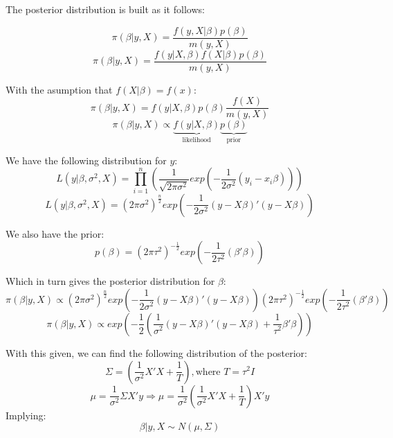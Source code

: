\documentclass[12pt,onecolumn]{article}
\begin{document}
\begin{enumerate}
  The posterior distribution is built as it follows:

  \begin{equation*}
      \pi(\beta|y,X)=\frac{f(y,X|\beta)p(\beta)}{m(y,X)}
  \end{equation*}
  \begin{equation*}
    \pi(\beta|y,X)=\frac{f(y|X,\beta)f(X|\beta)p(\beta)}{m(y,X)}
  \end{equation*}

  With the asumption that $f(X|\beta)=f(x)$:
  \begin{equation*}
      \pi(\beta|y,X)=f(y|X,\beta)p(\beta)\frac{f(X)}{m(y,X)}
  \end{equation*}
  \begin{equation*}
      \pi(\beta|y,X)\propto\underbrace{f(y|X,\beta)}_\text{likelihood}\underbrace{p(\beta)}_\text{prior}
  \end{equation*}

  We have the following distribution for $y$:
  \begin{equation*}
      L(y|\beta,\sigma^2,X)=\prod_{i=1}^{n}\left(\frac{1}{\sqrt{2\pi\sigma^2}}exp\left({-\frac{1}{2\sigma^2}(y_i-x_i\beta)}\right)\right)
  \end{equation*}
  \begin{equation*}
      L(y|\beta,\sigma^2,X)=(2\pi\sigma^2)^{\frac{n}{2}}{exp\left(-\frac{1}{2\sigma^2}(y-X\beta)'(y-X\beta)\right)}
  \end{equation*}

  We also have the prior:
  \begin{equation*}
      p(\beta)=\left(2\pi\tau^2\right)^{-\frac{1}{2}}exp\left(-\frac{1}{2\tau^2}(\beta'\beta)\right)
  \end{equation*}

  Which in turn gives the posterior distribution for $\beta$:
  \begin{equation*}
      \pi(\beta|y,X)\propto(2\pi\sigma^2)^{\frac{n}{2}}{exp\left(-\frac{1}{2\sigma^2}(y-X\beta)'(y-X\beta)\right)}\left(2\pi\tau^2\right)^{-\frac{1}{2}}exp\left(-\frac{1}{2\tau^2}(\beta'\beta)\right)
  \end{equation*}
  \begin{equation*}
      \pi(\beta|y,X)\propto{exp\left(-\frac{1}{2}\left(\frac{1}{\sigma^2}{(y-X\beta)'(y-X\beta)}+\frac{1}{\tau^2}\beta'\beta\right)\right)}
  \end{equation*}
  
  With this given, we can find the following distribution of the posterior:
  \begin{equation*}
      \Sigma=\left(\frac{1}{\sigma^2}X'X+\frac{1}{T}\right), \text{where $T=\tau^2I$}
  \end{equation*}
  \begin{equation*}
      \mu=\frac{1}{\sigma^2}\Sigma{X'y}\Rightarrow\mu=\frac{1}{\sigma^2}\left(\frac{1}{\sigma^2}X'X+\frac{1}{T}\right)X'y
  \end{equation*}
  Implying:
  \begin{equation*}
      \beta|y,X\sim{N}(\mu,\Sigma)
  \end{equation*}


\end{enumerate}
\end{document}
